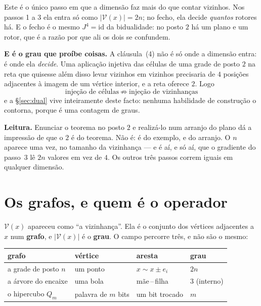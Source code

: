 \documentclass[11pt,a4paper]{article}
\begin{document}
\medskip\noindent Este é o único passo em que a dimensão faz mais do que contar
vizinhos. Nos passos 1 a 3 ela entra só como $\lvert \mathcal{V}(x)\rvert=2n$; no fecho,
ela decide \emph{quantos} rotores há. E o fecho é o mesmo $J^{4}=\mathrm{id}$ da
bidualidade: no posto $2$ há um plano e um rotor, que é a razão por que ali os
dois se confundem.

\medskip\noindent\textbf{E é o grau que proíbe coisas.} A cláusula~(4) não é só
onde a dimensão entra: é onde ela \emph{decide}. Uma aplicação injetiva das
células de uma grade de posto $2$ na reta que quisesse além disso levar vizinhos
em vizinhos
precisaria de $4$ posições adjacentes à imagem de um vértice interior, e a reta
oferece $2$. Logo
\[
\boxed{\ \text{injeção de células}\ \not\Rightarrow\ \text{injeção de vizinhanças}\ }
\]
e a §\ref{sec:dual} vive inteiramente deste facto: nenhuma habilidade de
construção o contorna, porque é uma contagem de graus.

\medskip\noindent\textbf{Leitura.} Enunciar o teorema no posto $2$ e realizá-lo num
arranjo do plano dá a impressão de que o $2$ é do teorema. Não é: é do exemplo, e
do arranjo. O $n$ aparece uma vez, no tamanho da vizinhança --- e é aí, e só aí,
que o gradiente do passo~3 lê $2n$ valores em vez de $4$. Os outros três passos
correm iguais em qualquer dimensão.

\section{Os grafos, e quem é o operador}\label{sec:geo}

\noindent $\mathcal{V}(x)$ apareceu como ``a vizinhança''. Ela é o conjunto dos vértices
adjacentes a $x$ num \textbf{grafo}, e $\lvert \mathcal{V}(x)\rvert$ é o \textbf{grau}. O
campo percorre três, e não são o mesmo:

\begin{center}\small
\begin{tabular}{@{}llll@{}}
\toprule
grafo & vértice & aresta & grau \\
\midrule
a grade de posto $n$ & um ponto & $x\sim x\pm e_i$ & $2n$ \\
a árvore do encaixe & uma bola & mãe\,--\,filha & $3$ (interno) \\
o hipercubo $Q_m$ & palavra de $m$ bits & um bit trocado & $m$ \\
\bottomrule
\end{tabular}
\end{center}
\end{document}
